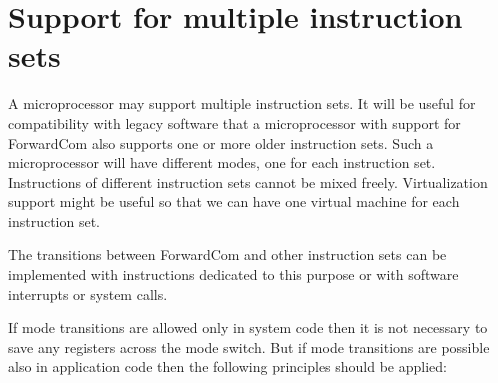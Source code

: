 \documentclass[forwardcom.tex]{subfiles}
\begin{document}
\RaggedRight

\chapter{Support for multiple instruction sets}

A microprocessor may support multiple instruction sets. It will be useful for compatibility with legacy software that a microprocessor with support for ForwardCom also supports one or more older instruction sets. Such a microprocessor will have different modes, one for each instruction set. Instructions of different instruction sets cannot be mixed freely. Virtualization support might be useful so that we can have one virtual machine for each instruction set.
\vspace{2mm}

The transitions between ForwardCom and other instruction sets can be implemented with instructions dedicated to this purpose or with software interrupts or system calls. 
\vspace{2mm}

If mode transitions are allowed only in system code then it is not necessary to save any registers across the mode switch. But if mode transitions are possible also in application code then the following principles should be applied:
\end{document}
